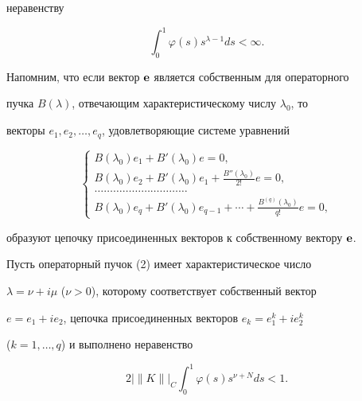 неравенству 


\begin{equation} 


\int^1_0\varphi(s)s^{\lambda-1}ds<\infty. 


\end{equation} 


 


Напомним, что если вектор $\bold e$ является собственным для операторного 


пучка $B(\lambda)$, отвечающим характеристическому числу $\lambda_0$, то 


векторы $e_1,e_2,\dotsc,e_q$, удовлетворяющие системе уравнений 


$$ 


\begin{cases} 


B(\lambda_0)e_1+B'(\lambda_0)e=0,\\ 


B(\lambda_0)e_2+B'(\lambda_0)e_1+ 


\frac{B''(\lambda_0)}{2!}e=0,\\ 


\dotsc\dotsc\dotsc\dotsc\dotsc\dotsc\dotsc\dotsc\dotsc\dotsc \\ 


B(\lambda_0)e_q+B'(\lambda_0)e_{q-1}+\dotsb+ 


\frac{B^{(q)}(\lambda_0)}{q!}e=0, 


\end{cases} 


$$ 


образуют цепочку присоединенных векторов к собственному вектору $\bold 


e$. 


 


Пусть операторный пучок (2) имеет характеристическое число 


$\lambda=\nu+i\mu$ ($\nu>0$), которому соответствует собственный вектор 


$e=e_1+ie_2$, цепочка присоединенных векторов $e_k=e^k_1+ie^k_2$ 


($k=1,\dotsc,q$) и выполнено неравенство 


\begin{equation} 


2\big|\|K\|\big|_C\int^1_0\varphi(s)s^{\nu+N}ds<1. 


\end{equation} 


